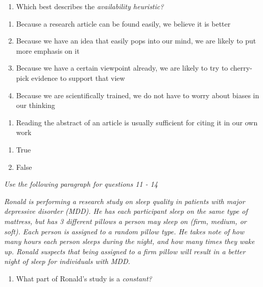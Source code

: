 \documentclass[
  12pt,
  letterpaper,
  DIV=11,
  numbers=noendperiod]{scrartcl}
\providecommand{\tightlist}{%
  \setlength{\itemsep}{0pt}\setlength{\parskip}{0pt}}\usepackage{longtable,booktabs,array}
\begin{document}
\begin{enumerate}
\def\labelenumi{\arabic{enumi}.}
\setcounter{enumi}{8}
\tightlist
\item
  Which best describes the \emph{availability heuristic?}
\end{enumerate}

\begin{enumerate}
\def\labelenumi{\alph{enumi}.}
\tightlist
\item
  Because a research article can be found easily, we believe it is
  better
\item
  Because we have an idea that easily pops into our mind, we are likely
  to put more emphasis on it
\item
  Because we have a certain viewpoint already, we are likely to try to
  cherry-pick evidence to support that view
\item
  Because we are scientifically trained, we do not have to worry about
  biases in our thinking
\end{enumerate}

\begin{enumerate}
\def\labelenumi{\arabic{enumi}.}
\setcounter{enumi}{9}
\tightlist
\item
  Reading the abstract of an article is usually sufficient for citing it
  in our own work
\end{enumerate}

\begin{enumerate}
\def\labelenumi{\alph{enumi}.}
\tightlist
\item
  True
\item
  False
\end{enumerate}

\emph{Use the following paragraph for questions 11 - 14}

\emph{Ronald is performing a research study on sleep quality in patients
with major depressive disorder (MDD). He has each participant sleep on
the same type of mattress, but has 3 different pillows a person may
sleep on (firm, medium, or soft). Each person is assigned to a random
pillow type. He takes note of how many hours each person sleeps during
the night, and how many times they wake up. Ronald suspects that being
assigned to a firm pillow will result in a better night of sleep for
individuals with MDD.}

\newpage{}

\begin{enumerate}
\def\labelenumi{\arabic{enumi}.}
\setcounter{enumi}{10}
\tightlist
\item
  What part of Ronald's study is a \emph{constant?}
\end{enumerate}
\end{document}
